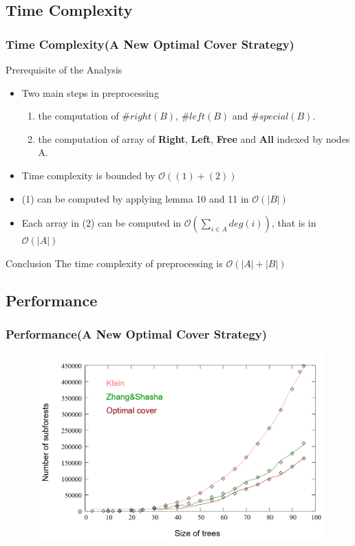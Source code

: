 \documentclass{beamer}
\begin{document}
\subsection{Time Complexity}
\begin{frame}
\frametitle{Time Complexity(A New Optimal Cover Strategy)}
\begin{block}{Prerequisite of the Analysis}
\begin{itemize}
\item Two main steps in preprocessing
\begin{enumerate}[(1)]
\item the computation of $\#right(B)$, $\#left(B)$ and $\#special(B)$.
\item the computation of array of \textbf{Right}, \textbf{Left}, \textbf{Free} and \textbf{All} indexed by nodes A.
\end{enumerate}
\item Time complexity is bounded by $\mathcal{O}((1) + (2))$
\item (1) can be computed by applying lemma 10 and 11 in $\mathcal{O}(\left\vert B \right\vert)$
\item Each array in (2) can be computed in $\mathcal{O}(\sum_{i \in A}deg(i))$, that is in $\mathcal{O}(\left\vert A \right\vert)$
\end{itemize}
\end{block}
\begin{block}{Conclusion}
The time complexity of preprocessing is $\mathcal{O}(\left\vert A \right\vert + \left\vert B \right\vert)$
\end{block}

\end{frame}


\subsection{Performance}
\begin{frame}
\frametitle{Performance(A New Optimal Cover Strategy)}
\begin{figure}
	\includegraphics[width=1.0\linewidth]{performance}
	\label{Performance} 
	\centering
\end{figure}
\end{frame}
\end{document}
